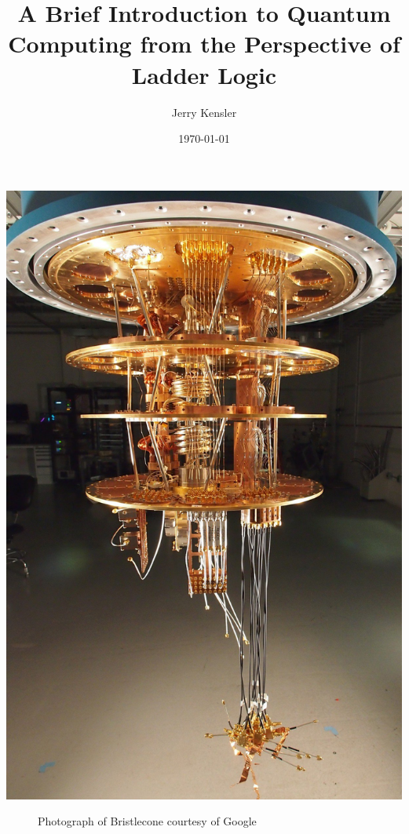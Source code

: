\documentclass[a4paper]{article}
\title{A Brief Introduction to Quantum Computing from the Perspective of Ladder Logic\vspace{-0ex}}
\author{Jerry Kensler\vspace{-0ex}}
\date{\today\vspace{-0ex}}
\begin{document}
	
		\maketitle %
		\let\originalnewpage\newpage \let\newpage\relax \let\newpage\originalnewpage
		\begin{center}		\includegraphics[scale=0.12]{googlequantumcomputer} %
		\end{center}
	\textcolor{mygray}{
			\begin{figure}%
			\caption{Photograph of Bristlecone courtesy of Google}\label{titleImage} %
			\end{figure}}
\end{document}
